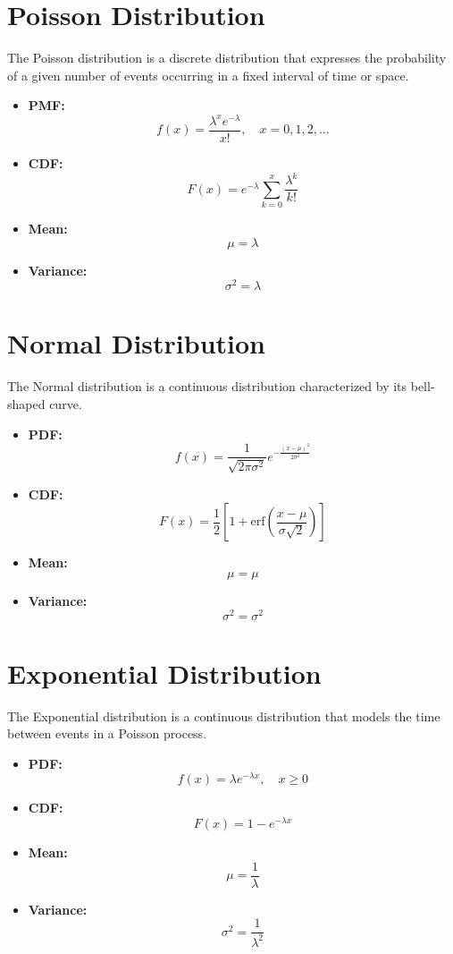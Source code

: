 \documentclass{article}
\begin{document}
\section{Poisson Distribution}
The Poisson distribution is a discrete distribution that expresses the probability of a given number of events occurring in a fixed interval of time or space.

\begin{itemize}
    \item \textbf{PMF:} 
    \[
    f(x) = \frac{\lambda^x e^{-\lambda}}{x!}, \quad x = 0, 1, 2, \ldots
    \]
    \item \textbf{CDF:} 
    \[
    F(x) = e^{-\lambda} \sum_{k=0}^{x} \frac{\lambda^k}{k!}
    \]
    \item \textbf{Mean:} 
    \[
    \mu = \lambda
    \]
    \item \textbf{Variance:} 
    \[
    \sigma^2 = \lambda
    \]
\end{itemize}

\section{Normal Distribution}
The Normal distribution is a continuous distribution characterized by its bell-shaped curve.

\begin{itemize}
    \item \textbf{PDF:} 
    \[
    f(x) = \frac{1}{\sqrt{2\pi \sigma^2}} e^{-\frac{(x - \mu)^2}{2\sigma^2}}
    \]
    \item \textbf{CDF:} 
    \[
    F(x) = \frac{1}{2} \left[ 1 + \text{erf}\left(\frac{x - \mu}{\sigma \sqrt{2}}\right) \right]
    \]
    \item \textbf{Mean:} 
    \[
    \mu = \mu
    \]
    \item \textbf{Variance:} 
    \[
    \sigma^2 = \sigma^2
    \]
\end{itemize}

\section{Exponential Distribution}
The Exponential distribution is a continuous distribution that models the time between events in a Poisson process.

\begin{itemize}
    \item \textbf{PDF:} 
    \[
    f(x) = \lambda e^{-\lambda x}, \quad x \geq 0
    \]
    \item \textbf{CDF:} 
    \[
    F(x) = 1 - e^{-\lambda x}
    \]
    \item \textbf{Mean:} 
    \[
    \mu = \frac{1}{\lambda}
    \]
    \item \textbf{Variance:} 
    \[
    \sigma^2 = \frac{1}{\lambda^2}
    \]
\end{itemize}
\end{document}
